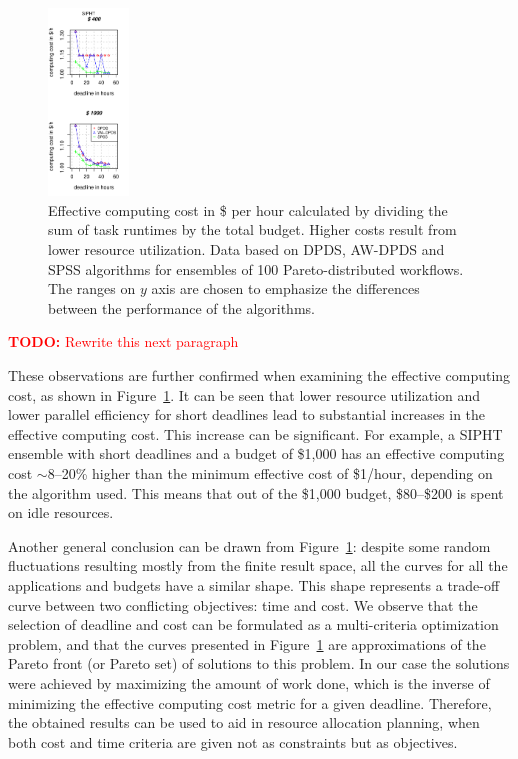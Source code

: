 \documentclass[conference]{IEEEtran}
\newcommand{\TODO}[1]{
  {\Large \textcolor{red}{\textbf{TODO: }#1}}
}
\begin{document}
\begin{figure}[htb]
\includegraphics[width=0.19\textwidth]{pareto-cost-SIPHT-n-1000-8-dagh5-50m0}
\caption{Effective computing cost in \$ per hour calculated by dividing the sum of
task runtimes by the total budget. Higher costs result from lower resource utilization. Data based on DPDS, AW-DPDS and SPSS algorithms for ensembles of 100
Pareto-distributed workflows. The ranges on $y$ axis are chosen to 
emphasize the differences  between  the performance of the algorithms.}
\label{fig:cost}
\end{figure}

\TODO{Rewrite this next paragraph}

These observations are further confirmed when examining the effective computing
cost, as shown in Figure~\ref{fig:cost}. It can be seen that lower resource
utilization and lower parallel efficiency for short deadlines lead to
substantial increases in the effective computing cost. This increase can be 
significant. For example, a SIPHT ensemble with short deadlines and a budget
of \$1,000 has an effective computing cost $\sim$8--20\% higher than the 
minimum effective cost of \$1/hour, depending on the algorithm used. This means 
that out of the \$1,000 budget, \$80--\$200 is spent on idle resources.

Another general conclusion can be drawn from Figure~\ref{fig:cost}: despite some
random fluctuations resulting mostly from the finite result space, all the
curves for all the applications and budgets have a similar shape. This shape
represents a trade-off curve between two conflicting objectives: time and cost.
We observe that the selection of deadline and cost can be formulated as a
multi-criteria optimization problem, and that the curves presented in 
Figure~\ref{fig:cost} are approximations of the Pareto front (or Pareto set) of
solutions to this problem. In our case the solutions were achieved by maximizing
the amount of work done, which is the inverse of minimizing the effective 
computing cost metric for a given deadline. Therefore, the obtained results 
can be used to aid in resource allocation planning, when both cost and time 
criteria are given not as constraints but as objectives.
\end{document}
